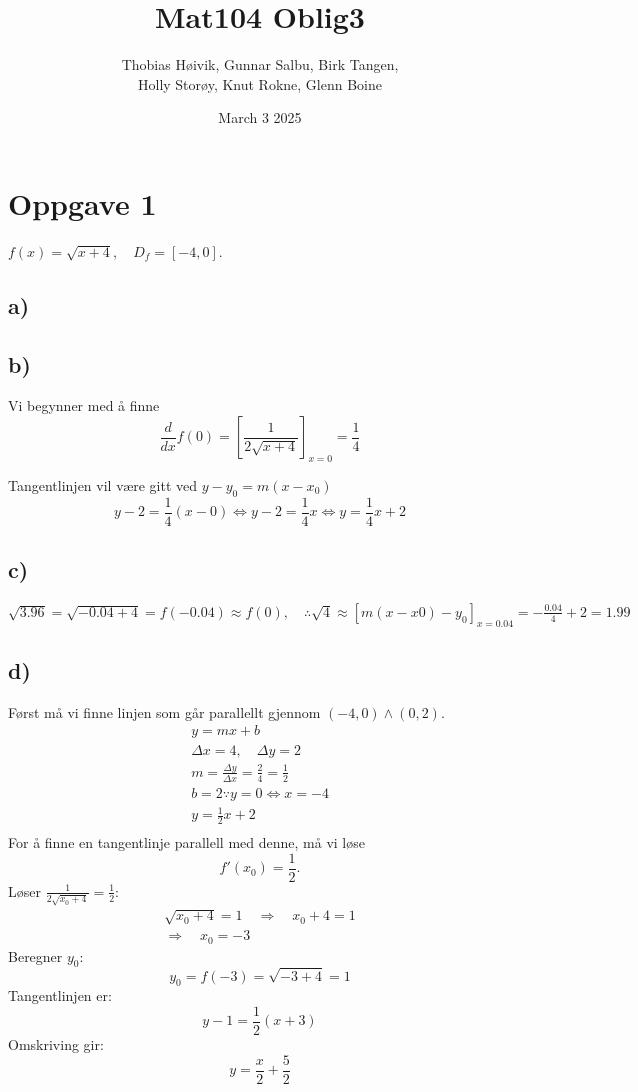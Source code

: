 \documentclass[12pt]{article}
\title{Mat104 Oblig3}
\author{Thobias Høivik, Gunnar Salbu, Birk Tangen, \\  
Holly Storøy, Knut Rokne, Glenn Boine}
\date{March 3 2025}
\begin{document}
\maketitle
\section*{Oppgave 1}
\(f(x) = \sqrt{x+4}, \quad D_f = [-4, 0] \).
\subsection*{a) }

\subsection*{b)}
Vi begynner med å finne
\[
\frac{d}{dx}f(0) = [\frac{1}{2\sqrt{x + 4}}]_{x=0}
= \frac{1}{4}
\]

\noindent
Tangentlinjen vil være gitt ved \(y-y_0 = m(x-x_0)\)
\[
  y-2 = \frac{1}{4}(x-0) \Leftrightarrow y-2 = \frac{1}{4}x 
  \Leftrightarrow \boxed{y=\frac{1}{4}x + 2}
\]

\subsection*{c)}
\(\sqrt{3.96} = \sqrt{-0.04 + 4} = f(-0.04) \approx f(0), 
\quad \therefore \sqrt{4} \approx [m(x-x0) - y_0]_{x = 0.04} 
= -\frac{0.04}{4} + 2 = \boxed{1.99}\)

\subsection*{d)}
Først må vi finne linjen som går parallellt gjennom \((-4, 0) \land (0, 2)\).
\begin{gather*}
  y = mx + b \\ 
  \Delta x = 4, \quad \Delta y = 2 \\ 
  m = \frac{\Delta y}{\Delta x} = \frac{2}{4} = \frac{1}{2} \\ 
  b = 2 \because y = 0 \Leftrightarrow x = -4 \\ 
  y = \frac{1}{2}x + 2 \\ 
\end{gather*}
For å finne en tangentlinje parallell med denne, må vi løse 
\[
f'(x_0) = \frac{1}{2}.
\]
Løser \( \frac{1}{2\sqrt{x_0+4}} = \frac{1}{2} \):
\begin{gather*}
    \sqrt{x_0+4} = 1 \quad \Rightarrow \quad x_0 + 4 = 1 
    \\ \Rightarrow \quad \boxed{x_0 = -3}
\end{gather*}
Beregner \( y_0 \):
\[
    \boxed{y_0 = f(-3) = \sqrt{-3+4} = 1}
\]
Tangentlinjen er:
\[
y - 1 = \frac{1}{2}(x + 3)
\]
Omskriving gir:
\[
\boxed{y = \frac{x}{2} + \frac{5}{2}}
\]
\end{document}
